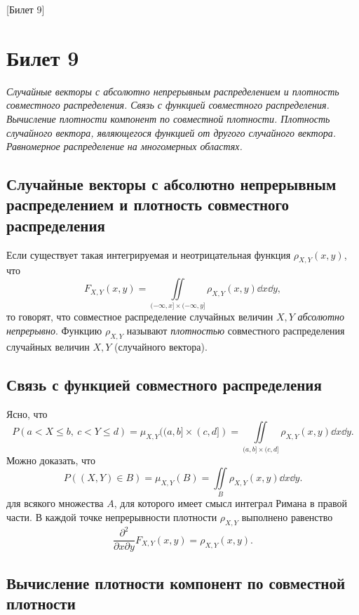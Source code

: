 [Билет 9]

\section{Билет 9}

\begin{center}
    \it Случайные векторы с абсолютно непрерывным распределением и плотность совместного распределения.
    Связь с функцией совместного распределения.
    Вычисление плотности компонент по совместной плотности.
    Плотность случайного вектора, являющегося функцией от другого случайного вектора.
    Равномерное распределение на многомерных областях.
\end{center}

\sectionbreak
\subsection{Случайные векторы с абсолютно непрерывным распределением и плотность совместного распределения}

\begin{definition}
    Если существует такая интегрируемая и неотрицательная функция $\rho_{X, Y}(x, y)$, что
    \[
        F_{X, Y}(x, y) = \iint\limits_{(-\infty, x] \times (-\infty, y]} \rho_{X, Y}(x, y) \dd x \dd y,
    \]
    то говорят, что совместное распределение случайных величин $X, Y$ {\it абсолютно непрерывно}.
    Функцию $\rho_{X, Y}$ называют {\it плотностью} совместного распределения случайных величин $X, Y$ (случайного вектора).
\end{definition}

\sectionbreak
\subsection{Связь с функцией совместного распределения}

Ясно, что
\[
    P(a < X \leqslant b,~c < Y \leqslant d) = \mu_{X, Y}((a, b] \times (c, d]) = \iint\limits_{(a, b] \times (c, d]} \rho_{X,Y}(x, y) \dd x \dd y.
\]
Можно доказать, что
\[
    P((X, Y) \in B) = \mu_{X, Y}(B) = \iint\limits_B \rho_{X, Y}(x, y) \dd x \dd y.
\]
для всякого множества $A$, для которого имеет смысл интеграл Римана в правой части.
В каждой точке непрерывности плотности $\rho_{X, Y}$ выполнено равенство
\[
    \frac{\partial^2}{\partial x \partial y} F_{X, Y}(x, y) = \rho_{X, Y}(x, y).
\]

\sectionbreak
\subsection{Вычисление плотности компонент по совместной плотности}

